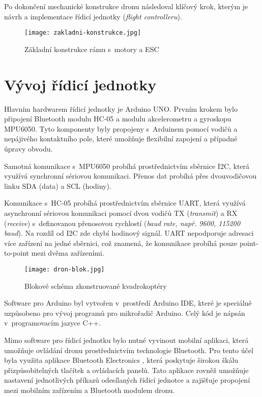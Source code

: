 \documentclass[12pt]{report}
\begin{document}
Po dokončení mechanické konstrukce dronu následoval klíčový krok, kterým je návrh a implementace řídicí jednotky (\textit{flight controlleru}).

\begin{figure}[H]
	\centering
	\texttt{[image: zakladni-konstrukce.jpg]}
	\caption{Základní konstrukce rámu s~motory a ESC}
	\label{fig:zakladni-konstrukce.jpg}
\end{figure}

\chapter[Vývoj řídicí jednotky]{Vývoj řídicí jednotky}
Hlavním hardwarem řídicí jednotky je Arduino UNO. Prvním krokem bylo připojení Bluetooth modulu HC-05 a modulu akcelerometru a gyroskopu MPU6050. Tyto komponenty byly propojeny s~Arduinem pomocí vodičů a nepájivého kontaktního pole, které umožňuje flexibilní zapojení a případné úpravy obvodu.

Samotná komunikace s~MPU6050 probíhá prostřednictvím sběrnice I2C, která využívá synchronní sériovou komunikaci. Přenos dat probíhá přes dvouvodičovou linku SDA (data) a SCL (hodiny). \cite{i2c}

Komunikace s~HC-05 probíhá prostřednictvím sběrnice UART, která využívá asynchronní sériovou komunikaci pomocí dvou vodičů TX (\textit{transmit}) a RX (\textit{receive}) s~definovanou přenosovou rychlostí (\textit{baud rate, např. 9600, 115200 baud}). Na rozdíl od I2C zde chybí hodinový signál. UART nepodporuje adresaci více zařízení na jedné sběrnici, což znamená, že komunikace probíhá pouze point-to-point mezi dvěma zařízeními. \cite{uart}

\begin{figure}[H]
	\centering
	\texttt{[image: dron-blok.jpg]}
	\caption{Blokové schéma zkonstruované kvadrokoptéry}
	\label{fig:dron-blok.jpg}
\end{figure}


Software pro Arduino byl vytvořen v~prostředí Arduino IDE, které je speciálně uzpůsobeno pro vývoj programů pro mikrořadič Arduino. Celý kód je nápsán v~programovacím jazyce C++.

Mimo software pro řídicí jednotku bylo nutné vyvinout mobilní aplikaci, která umožňuje ovládání dronu prostřednictvím technologie Bluetooth. Pro tento účel byla využita aplikace Bluetooth Electronics \cite{be}, která poskytuje širokou škálu přizpůsobitelných tlačítek a ovládacích panelů. Tato aplikace rovněž umožňuje nastavení jednotlivých příkazů odesílaných řídicí jednotce a zajišťuje propojení mezi mobilním zařízením a Bluetooth modulem dronu.
\end{document}
